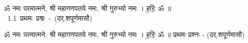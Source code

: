 \documentclass[17pt]{extarticle}
\begin{document}
\begin{titlepage}
    \begin{center}
 
\begin{sanskrit}
    { \Large
    ॐ नमः परमात्मने, श्री महागणपतये नमः, 
श्री गुरुभ्यो नमः । ह॒रिः॒ ॐ ॥ 
    }
    \\
    \vspace{2.5cm}
    \mbox{ \Huge
    1.1     प्रथमः प्रश्नः - (दर्.शपूर्णमासौ)   }
\end{sanskrit}
\end{center}

\end{titlepage}
\tableofcontents

ॐ नमः परमात्मने, श्री महागणपतये नमः, 
श्री गुरुभ्यो नमः । ह॒रिः॒ ॐ ॥      प्रथमः प्रश्नः - (दर्.शपूर्णमासौ) \newline

\end{document}
